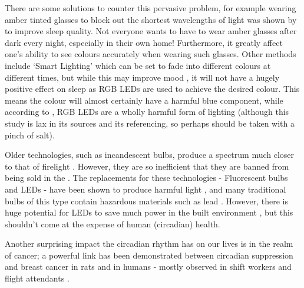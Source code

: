 \documentclass[twoside,twocolumn]{article}
\begin{document}
There are some solutions to counter this pervasive problem, for example wearing amber tinted glasses to block out the shortest wavelengths of light was shown by \cite{kimberlyAmberLensesBlock2009} to improve sleep quality. Not everyone wants to have to wear amber glasses after dark every night, especially in their own home!
Furthermore, it greatly affect one's ability to see colours accurately when wearing such glasses. Other methods include `Smart Lighting' which can be set to fade into different colours at different times, but while this may improve mood \citep{mccloughanImpactLightingMood1999}, it will not have a hugely positive effect on sleep as RGB LEDs are used to achieve the desired colour. This means the colour will almost certainly have a harmful blue component, while according to  \cite{gilewskiEcologicalHarmfulnessRGB2018}, RGB LEDs are a wholly harmful form of lighting (although this study is lax in its sources and its referencing, so perhaps should be taken with a pinch of salt). 

Older technologies, such as incandescent bulbs, produce a spectrum much closer to that of firelight \citep{f.luxsoftwarellcLuxometer}. However, they are so inefficient that they are banned from being sold in the \cite{euDirective201227}. The replacements for these technologies - Fluorescent bulbs and LEDs - have been shown to produce harmful light \citep{uedaEyeDamageControl2009, kuseDamagePhotoreceptorderivedCells2014, niwanoBlueLightInjures2014, marekBlueLightPhototoxicity2018, nakamuraExposureExcessiveBlue2018}, and many traditional bulbs of this type contain hazardous materials such as lead \citep{limPotentialEnvironmentalImpacts2013}. However, there is huge potential for LEDs to save much power in the built environment \citep{montoyaIndoorLightingTechniques2017}, but this shouldn't come at the expense of human (circadian) health. 

Another surprising impact the circadian rhythm has on our lives is in the realm of cancer; a powerful link has been demonstrated between circadian suppression and breast cancer in rats \citep{mhatreEffectVaryingPhotoperiods1984, otaloraEffectsExogenousMelatonin2008, vandenheiligenbergTumorPromotingEffect1999} and in humans - mostly observed in shift workers and flight attendants \citep{hansenIncreasedBreastCancer2001, davisNightShiftWork2001, schernhammerRotatingNightShifts2001, schernhammerNightWorkRisk2006, lieBreastCancerNight2006, tokumaruIncidenceCancerFemale2006, olearyShiftWorkLight2006, kolstadNightshiftWorkRisk2008, stevensLightatnightCircadianDisruption2009, stevensBreastCancerCircadian2014}.
\end{document}

